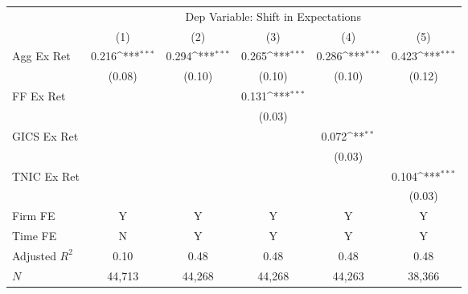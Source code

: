          {         \def\sym#1{\ifmmode^{#1}\else\(^{#1}\)\fi}         \begin{tabular}{l*{5}{c}}         \toprule          &\multicolumn{5}{c}{Dep Variable: Shift in Expectations} \\         \cmidrule(lr){2-6}           &\multicolumn{1}{c}{(1)}&\multicolumn{1}{c}{(2)} &\multicolumn{1}{c}{(3)}         &\multicolumn{1}{c}{(4)}        &\multicolumn{1}{c}{(5)} \\         
\midrule
Agg Ex Ret  &       0.216\sym{***}&       0.294\sym{***}&       0.265\sym{***}&       0.286\sym{***}&       0.423\sym{***}\\
            &      (0.08)         &      (0.10)         &      (0.10)         &      (0.10)         &      (0.12)         \\
FF Ex Ret   &                     &                     &       0.131\sym{***}&                     &                     \\
            &                     &                     &      (0.03)         &                     &                     \\
GICS Ex Ret &                     &                     &                     &       0.072\sym{**} &                     \\
            &                     &                     &                     &      (0.03)         &                     \\
TNIC Ex Ret &                     &                     &                     &                     &       0.104\sym{***}\\
            &                     &                     &                     &                     &      (0.03)         \\
         \cmidrule(lr){1-6}          \multicolumn{1}{l}{Firm FE} & Y&Y&Y&Y&Y \\         \multicolumn{1}{l}{Time FE} & N&Y&Y&Y&Y \\         
Adjusted $R^2$&        0.10         &        0.48         &        0.48         &        0.48         &        0.48         \\
$N$         &      44,713         &      44,268         &      44,268         &      44,263         &      38,366         \\
\bottomrule                         \end{tabular}                         }
